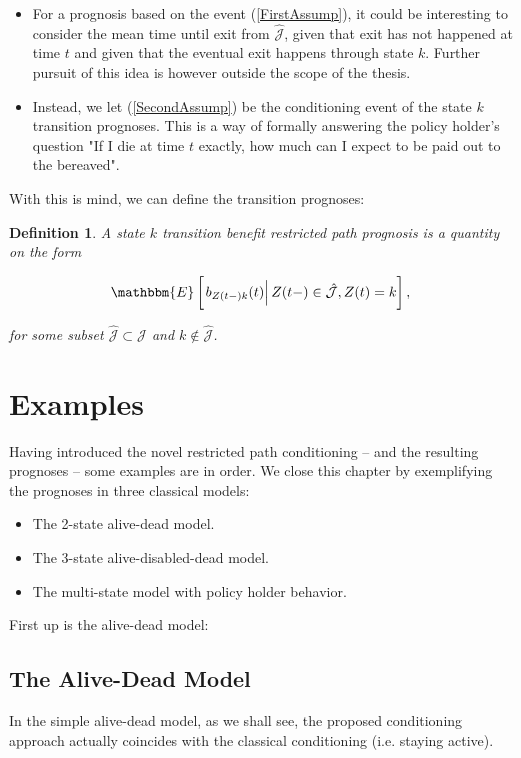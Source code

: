 \documentclass{book}
\newcommand{\1}[1]{\mathbbm{1}_{\left\lbrace #1 \right\rbrace}}
\newcommand{\econd}[2][def]{\mathbbm{E} \left[ \left. #1 \right| #2 \right]}
\theoremstyle{break}
\newtheorem{definition}{Definition}%
\theoremstyle{remark}
\numberwithin{equation}{section}
\begin{document}
\begin{itemize}
	\item For a prognosis based on the event (\ref{FirstAssump}), it could be interesting to consider the mean time until exit from $\hat{\mathcal{J}}$, given that exit has not happened at time $t$ and given that the eventual exit happens through state $k$. Further pursuit of this idea is however outside the scope of the thesis.
	\item Instead, we let (\ref{SecondAssump}) be the conditioning event of the state $k$ transition prognoses. This is a way of formally answering the policy holder's question "If I die at time $t$ exactly, how much can I expect to be paid out to the bereaved".
\end{itemize}

With this is mind, we can define the transition prognoses:

\begin{definition}
	A state $k$ transition benefit restricted path prognosis is a quantity on the form
	
	\begin{gather*}
		\econd[b_{Z(t-)k}(t)]{Z(t-) \in \hat{\mathcal{J}}, Z(t)=k},
	\end{gather*}
	
	for some subset $\hat{\mathcal{J}} \subset \mathcal{J}$ and $k \notin \hat{\mathcal{J}}$.
\end{definition}

\section{Examples}

Having introduced the novel restricted path conditioning -- and the resulting prognoses -- some examples are in order. We close this chapter by exemplifying the prognoses in three classical models:

\begin{itemize}
	\item The 2-state alive-dead model.
	\item The 3-state alive-disabled-dead model.
	\item The multi-state model with policy holder behavior.
\end{itemize}

First up is the alive-dead model:

\subsection{The Alive-Dead Model}
In the simple alive-dead model, as we shall see, the proposed conditioning approach actually coincides with the classical conditioning (i.e. staying active).
\end{document}
